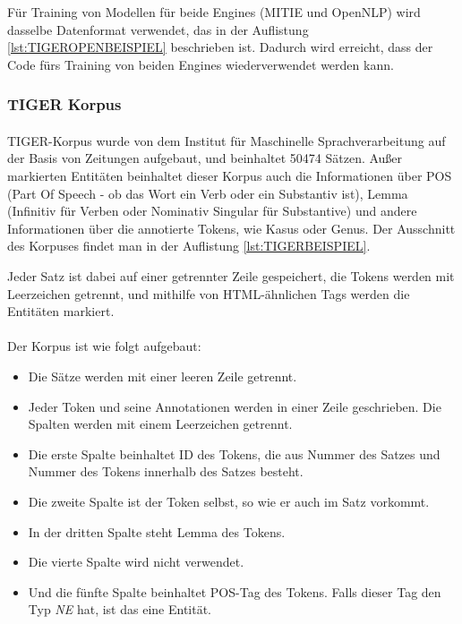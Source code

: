 Für Training von Modellen für beide Engines (MITIE und OpenNLP) wird dasselbe Datenformat verwendet, das in der Auflistung \ref{lst:TIGEROPENBEISPIEL} beschrieben ist. Dadurch wird erreicht, dass der Code fürs Training von beiden Engines wiederverwendet werden kann.



\subsubsection{TIGER Korpus}
\paragraph{}
TIGER-Korpus wurde von dem Institut für Maschinelle Sprachverarbeitung\cite{brants2004tiger} auf der Basis von Zeitungen aufgebaut, und beinhaltet 50474 Sätzen. Außer markierten Entitäten beinhaltet dieser Korpus auch die Informationen über POS (Part Of Speech - ob das Wort ein Verb oder ein Substantiv ist), Lemma (Infinitiv für Verben oder Nominativ Singular für Substantive) und andere Informationen über die annotierte Tokens, wie Kasus oder Genus. Der Ausschnitt des Korpuses findet man in der Auflistung \ref{lst:TIGERBEISPIEL}.


Jeder Satz ist dabei auf einer getrennter Zeile gespeichert, die Tokens werden mit Leerzeichen getrennt, und mithilfe von HTML-ähnlichen Tags werden die Entitäten markiert.

\paragraph{}
Der Korpus ist wie folgt aufgebaut:
\begin{itemize}
\item Die Sätze werden mit einer leeren Zeile getrennt.
\item Jeder Token und seine Annotationen werden in einer Zeile geschrieben. Die Spalten werden mit einem Leerzeichen getrennt.
\item Die erste Spalte beinhaltet ID des Tokens, die aus Nummer des Satzes und Nummer des Tokens innerhalb des Satzes besteht.
\item Die zweite Spalte ist der Token selbst, so wie er auch im Satz vorkommt.
\item In der dritten Spalte steht Lemma des Tokens.
\item Die vierte Spalte wird nicht verwendet.
\item Und die fünfte Spalte beinhaltet POS-Tag des Tokens. Falls dieser Tag den Typ \textit{NE} hat, ist das eine Entität.
\end{itemize}

